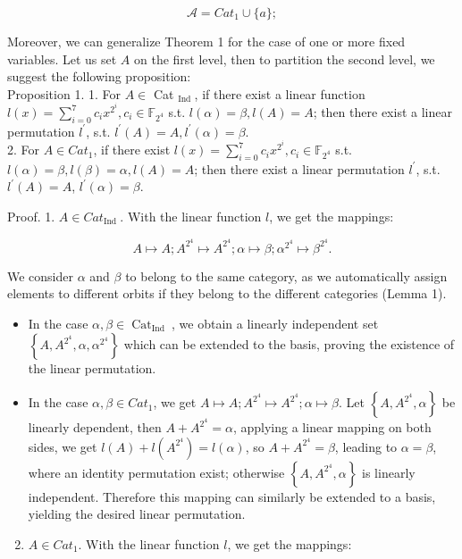 \documentclass[10pt]{article}
\begin{document}
$$
\mathcal{A}=C a t_{1} \cup\{a\} ;
$$

Moreover, we can generalize Theorem 1 for the case of one or more fixed variables. Let us set $A$ on the first level, then to partition the second level, we suggest the following proposition:\\
Proposition 1. 1. For $A \in$ Cat $_{\text {Ind }}$, if there exist a linear function $l(x)=\sum_{i=0}^{7} c_{i} x^{2^{i}}, c_{i} \in \mathbb{F}_{2^{4}}$ s.t. $l(\alpha)=\beta, l(A)=A$; then there exist a linear permutation $l^{\prime}$, s.t. $l^{\prime}(A)=A, l^{\prime}(\alpha)=\beta$.\\
2. For $A \in C a t_{1}$, if there exist $l(x)=\sum_{i=0}^{7} c_{i} x^{2^{i}}, c_{i} \in \mathbb{F}_{2^{4}}$ s.t. $l(\alpha)=\beta, l(\beta)=\alpha, l(A)=A$; then there exist a linear permutation $l^{\prime}$, s.t. $l^{\prime}(A)=A$, $l^{\prime}(\alpha)=\beta$.

Proof. 1. $A \in C a t_{\text {Ind }}$. With the linear function $l$, we get the mappings:

$$
A \mapsto A ; A^{2^{4}} \mapsto A^{2^{4}} ; \alpha \mapsto \beta ; \alpha^{2^{4}} \mapsto \beta^{2^{4}} .
$$

We consider $\alpha$ and $\beta$ to belong to the same category, as we automatically assign elements to different orbits if they belong to the different categories (Lemma 1).

\begin{itemize}
  \item In the case $\alpha, \beta \in \operatorname{Cat}_{\text {Ind }}$, we obtain a linearly independent set $\left\{A, A^{2^{4}}, \alpha, \alpha^{2^{4}}\right\}$ which can be extended to the basis, proving the existence of the linear permutation.
  \item In the case $\alpha, \beta \in C a t_{1}$, we get $A \mapsto A ; A^{2^{4}} \mapsto A^{2^{4}} ; \alpha \mapsto \beta$. Let $\left\{A, A^{2^{4}}, \alpha\right\}$ be linearly dependent, then $A+A^{2^{4}}=\alpha$, applying a linear mapping on both sides, we get $l(A)+ l\left(A^{2^{4}}\right)=l(\alpha)$, so $A+A^{2^{4}}=\beta$, leading to $\alpha=\beta$, where an identity permutation exist; otherwise $\left\{A, A^{2^{4}}, \alpha\right\}$ is linearly independent. Therefore this mapping can similarly be extended to a basis, yielding the desired linear permutation.
\end{itemize}

\begin{enumerate}
  \setcounter{enumi}{1}
  \item $A \in C a t_{1}$. With the linear function $l$, we get the mappings:
\end{enumerate}
\end{document}
